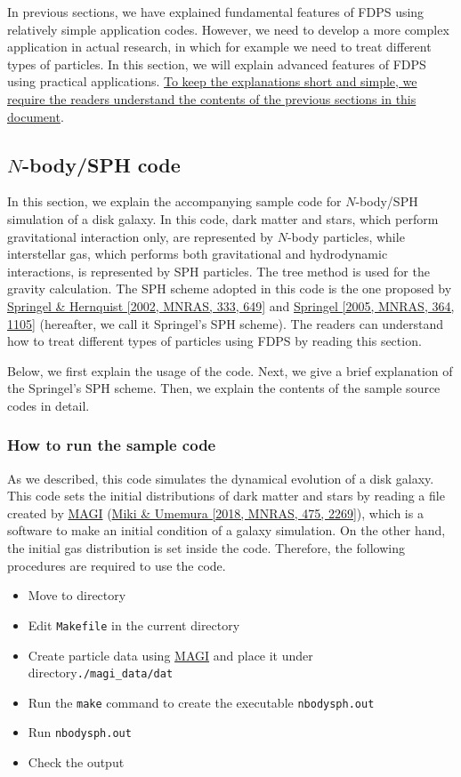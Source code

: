 In previous sections, we have explained fundamental features of FDPS using relatively simple application codes. However, we need to develop a more complex application in actual research, in which for example we need to treat different types of particles. In this section, we will explain advanced features of FDPS using practical applications. \ul{To keep the explanations short and simple, we require the readers understand the contents of the previous sections in this document}.
\subsection{$N$-body/SPH code} \label{subsec:NbodySPH}
In this section, we explain the accompanying sample code for $N$-body/SPH simulation of a disk galaxy. In this code, dark matter and stars, which perform gravitational interaction only, are represented by $N$-body particles, while interstellar gas, which performs both gravitational and hydrodynamic interactions, is represented by SPH particles. The tree method is used for the gravity calculation. The SPH scheme adopted in this code is the one proposed by \href{https://doi.org/10.1046/j.1365-8711.2002.05445.x}{Springel \& Hernquist [2002, MNRAS, 333, 649]} and \href{https://doi.org/10.1111/j.1365-2966.2005.09655.x}{Springel [2005, MNRAS, 364, 1105]} (hereafter, we call it Springel's SPH scheme). The readers can understand how to treat different types of particles using FDPS by reading this section.

Below, we first explain the usage of the code. Next, we give a brief explanation of the Springel's SPH scheme. Then, we explain the contents of the sample source codes in detail.

\subsubsection{How to run the sample code}
\label{subsubsec:NbodySPH_usage}
As we described, this code simulates the dynamical evolution of a disk galaxy. This code sets the initial distributions of dark matter and stars by reading a file created by \href{https://bitbucket.org/ymiki/magi}{\textsc{MAGI}} (\href{https://doi.org/10.1093/mnras/stx3327}{Miki \& Umemura [2018, MNRAS, 475, 2269]}), which is a software to make an initial condition of a galaxy simulation. On the other hand, the initial gas distribution is set inside the code. Therefore, the following procedures are required to use the code.
\begin{itemize}
\item Move to directory \dirNameNbodySPHSample
\item Edit \texttt{Makefile} in the current directory
\item Create particle data using \href{https://bitbucket.org/ymiki/magi}{\textsc{MAGI}} and place it under directory\texttt{./magi\_data/dat}
\item Run the \texttt{make} command to create the executable \texttt{nbodysph.out}
\item Run \texttt{nbodysph.out}
\item Check the output
\end{itemize}

